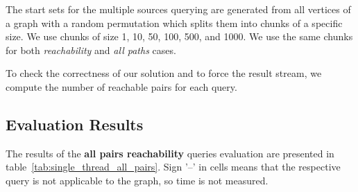The start sets for the multiple sources querying are generated from all vertices of a graph with a random permutation which splits them into chunks of a specific size. We use chunks of size 1, 10, 50, 100, 500, and 1000. We use the same chunks for both \textit{reachability} and \textit{all paths} cases.

To check the correctness of our solution and to force the result stream, we compute the number of reachable pairs for each query.

\subsection{Evaluation Results}



The results of the \textbf{all pairs reachability} queries evaluation are presented in table~\ref{tab:single_thread_all_pairs}. Sign '--' in cells means that the respective query is not applicable to the graph, so time is not measured.

